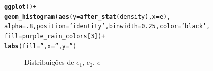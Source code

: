 \documentclass{homework}\usepackage[]{graphicx}\usepackage[]{color}
\makeatletter
\newcommand{\hlnum}[1]{\textcolor[rgb]{0.686,0.059,0.569}{#1}}%
\newcommand{\hlstr}[1]{\textcolor[rgb]{0.192,0.494,0.8}{#1}}%
\newcommand{\hlopt}[1]{\textcolor[rgb]{0,0,0}{#1}}%
\newcommand{\hlstd}[1]{\textcolor[rgb]{0.345,0.345,0.345}{#1}}%
\newcommand{\hlkwc}[1]{\textcolor[rgb]{0.333,0.667,0.333}{#1}}%
\newcommand{\hlkwd}[1]{\textcolor[rgb]{0.737,0.353,0.396}{\textbf{#1}}}%
\newenvironment{kframe}{%
 \def\at@end@of@kframe{}%
 \ifinner\ifhmode%
  \def\at@end@of@kframe{\end{minipage}}%
  \begin{minipage}{\columnwidth}%
 \fi\fi%
 \def\FrameCommand##1{\hskip\@totalleftmargin \hskip-\fboxsep
 \colorbox{shadecolor}{##1}\hskip-\fboxsep
     \hskip-\linewidth \hskip-\@totalleftmargin \hskip\columnwidth}%
 \MakeFramed {\advance\hsize-\width
   \@totalleftmargin\z@ \linewidth\hsize
   \@setminipage}}%
 {\par\unskip\endMakeFramed%
 \at@end@of@kframe}
\newenvironment{knitrout}{}{} %
\makeatother
\begin{document}
\begin{knitrout}
\begin{kframe}
\begin{alltt}
\hlkwd{ggplot}\hlstd{()} \hlopt{+}
  \hlkwd{geom_histogram}\hlstd{(}\hlkwd{aes}\hlstd{(}\hlkwc{y} \hlstd{=} \hlkwd{after_stat}\hlstd{(density),} \hlkwc{x} \hlstd{= e),}
                 \hlkwc{alpha} \hlstd{=} \hlnum{.8}\hlstd{,} \hlkwc{position} \hlstd{=} \hlstr{'identity'}\hlstd{,} \hlkwc{binwidth} \hlstd{=} \hlnum{0.25}\hlstd{,} \hlkwc{color} \hlstd{=} \hlstr{'black'}\hlstd{,}
                 \hlkwc{fill} \hlstd{= purple_rain_colors[}\hlnum{3}\hlstd{])} \hlopt{+}
  \hlkwd{labs}\hlstd{(}\hlkwc{fill} \hlstd{=} \hlstr{''}\hlstd{,} \hlkwc{x} \hlstd{=} \hlstr{''}\hlstd{,} \hlkwc{y} \hlstd{=} \hlstr{''}\hlstd{)}
\end{alltt}
\end{kframe}\begin{figure}
\caption[Distribuições de $e_1$, $e_2$, $e$]{Distribuições de $e_1$, $e_2$, $e$}\label{fig:Simul1}
\end{figure}

\end{knitrout}
\end{document}
